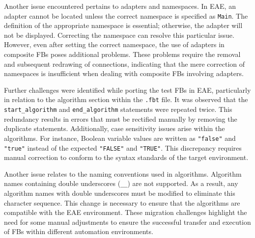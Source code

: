 Another issue encountered pertains to adapters and namespaces. In EAE, an adapter cannot be located unless the correct namespace is specified as \texttt{Main}. The definition of the appropriate namespace is essential; otherwise, the adapter will not be displayed. Correcting the namespace can resolve this particular issue. However, even after setting the correct namespace, the use of adapters in composite FBs poses additional problems. These problems require the removal and subsequent redrawing of connections, indicating that the mere correction of namespaces is insufficient when dealing with composite FBs involving adapters.

Further challenges were identified while porting the test FBs in EAE, particularly in relation to the algorithm section within the \texttt{.fbt} file. It was observed that the \texttt{start\_algorithm} and \texttt{end\_algorithm} statements were repeated twice. This redundancy results in errors that must be rectified manually by removing the duplicate statements. Additionally, case sensitivity issues arise within the algorithms. For instance, Boolean variable values are written as \texttt{"false"} and \texttt{"true"} instead of the expected \texttt{"FALSE"} and \texttt{"TRUE"}. This discrepancy requires manual correction to conform to the syntax standards of the target environment.

Another issue relates to the naming conventions used in algorithms. Algorithm names containing double underscores (\texttt{\_\_}) are not supported. As a result, any algorithm names with double underscores must be modified to eliminate this character sequence. This change is necessary to ensure that the algorithms are compatible with the EAE environment. These migration challenges highlight the need for some manual adjustments to ensure the successful transfer and execution of FBs within different automation environments.

